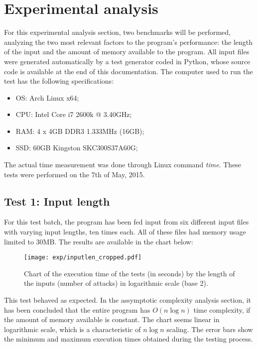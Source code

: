 \documentclass[10pt,a4paper]{article}
\numberwithin{equation}{section}
\begin{document}
\section{Experimental analysis}

For this experimental analysis section, two benchmarks will be performed, analyzing the two most relevant factors to the program's performance: the length of the input and the amount of memory available to the program. All input files were generated automatically by a test generator coded in Python, whose source code is available at the end of this documentation. The computer used to run the test has the following specifications:

\begin{itemize}
    \item OS: Arch Linux x64;
    \item CPU: Intel Core i7 2600k @ 3.40GHz;
    \item RAM: 4 x 4GB DDR3 1.333MHz (16GB);
    \item SSD: 60GB Kingston SKC300S37A60G;
\end{itemize}

The actual time measurement was done through Linux command \emph{time}. These tests were performed on the 7th of May, 2015.

\subsection{Test 1: Input length}

For this test batch, the program has been fed input from six different input files with varying input lengths, ten times each. All of these files had memory usage limited to 30MB. The results are available in the chart below:

\begin{figure}[H]
    \centering
    \texttt{[image: exp/inputlen\_cropped.pdf]}
    \caption{Chart of the execution time of the tests (in seconds) by the length of the inputs (number of attacks) in logarithmic scale (base 2).}
    \label{fig:inputlen}
\end{figure}

This test behaved as expected. In the assymptotic complexity analysis section, it has been concluded that the entire program has $O(n\log{n})$ time complexity, if the amount of memory available is constant. The chart seems linear in logarithmic scale, which is a characteristic of $n\log{n}$ scaling. The error bars show the minimum and maximum execution times obtained during the testing process.
\end{document}
